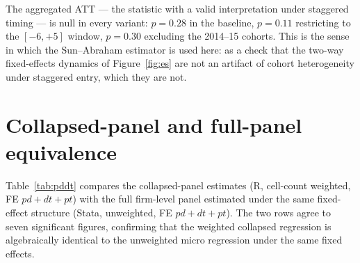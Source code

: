 \documentclass[12pt]{article}
\begin{document}
The aggregated ATT --- the statistic with a valid interpretation under staggered
timing --- is null in every variant: $p=0.28$ in the baseline, $p=0.11$ restricting to
the $[-6,+5]$ window, $p=0.30$ excluding the 2014--15 cohorts. This is the sense in
which the Sun--Abraham estimator is used here: as a check that the two-way
fixed-effects dynamics of Figure~\ref{fig:es} are not an artifact of cohort
heterogeneity under staggered entry, which they are not.

\section{Collapsed-panel and full-panel equivalence}\label{app:pddt}

Table~\ref{tab:pddt} compares the collapsed-panel estimates (R, cell-count weighted,
FE $pd+dt+pt$) with the full firm-level panel estimated under the same fixed-effect
structure (Stata, unweighted, FE $pd+dt+pt$). The two rows agree to seven significant
figures, confirming that the weighted collapsed regression is algebraically identical
to the unweighted micro regression under the same fixed effects.

\begin{table}[htbp]
\centering
\caption{Collapsed vs.\ full panel under $pd+dt+pt$ fixed effects (WB index)}
\label{tab:pddt}

\end{table}
\end{document}
